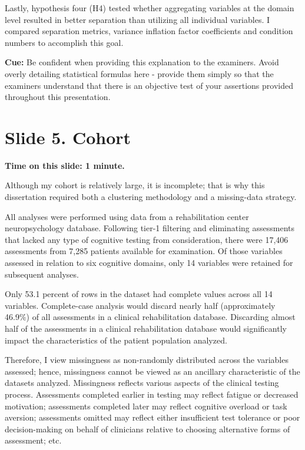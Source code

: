 \documentclass[
  11pt,
]{article}
\begin{document}
Lastly, hypothesis four (H4) tested whether aggregating variables at the
domain level resulted in better separation than utilizing all individual
variables. I compared separation metrics, variance inflation factor
coefficients and condition numbers to accomplish this goal.

\textbf{Cue:} Be confident when providing this explanation to the
examiners. Avoid overly detailing statistical formulas here - provide
them simply so that the examiners understand that there is an objective
test of your assertions provided throughout this presentation.

\section{Slide 5. Cohort}\label{slide-5.-cohort}

\textbf{Time on this slide: 1 minute.}

Although my cohort is relatively large, it is incomplete; that is why
this dissertation required both a clustering methodology and a
missing-data strategy.

All analyses were performed using data from a rehabilitation center
neuropsychology database. Following tier-1 filtering and eliminating
assessments that lacked any type of cognitive testing from
consideration, there were 17,406 assessments from 7,285 patients
available for examination. Of those variables assessed in relation to
six cognitive domains, only 14 variables were retained for subsequent
analyses.

Only 53.1 percent of rows in the dataset had complete values across all
14 variables. Complete-case analysis would discard nearly half
(approximately 46.9\%) of all assessments in a clinical rehabilitation
database. Discarding almost half of the assessments in a clinical
rehabilitation database would significantly impact the characteristics
of the patient population analyzed.

Therefore, I view missingness as non-randomly distributed across the
variables assessed; hence, missingness cannot be viewed as an ancillary
characteristic of the datasets analyzed. Missingness reflects various
aspects of the clinical testing process. Assessments completed earlier
in testing may reflect fatigue or decreased motivation; assessments
completed later may reflect cognitive overload or task aversion;
assessments omitted may reflect either insufficient test tolerance or
poor decision-making on behalf of clinicians relative to choosing
alternative forms of assessment; etc.
\end{document}
